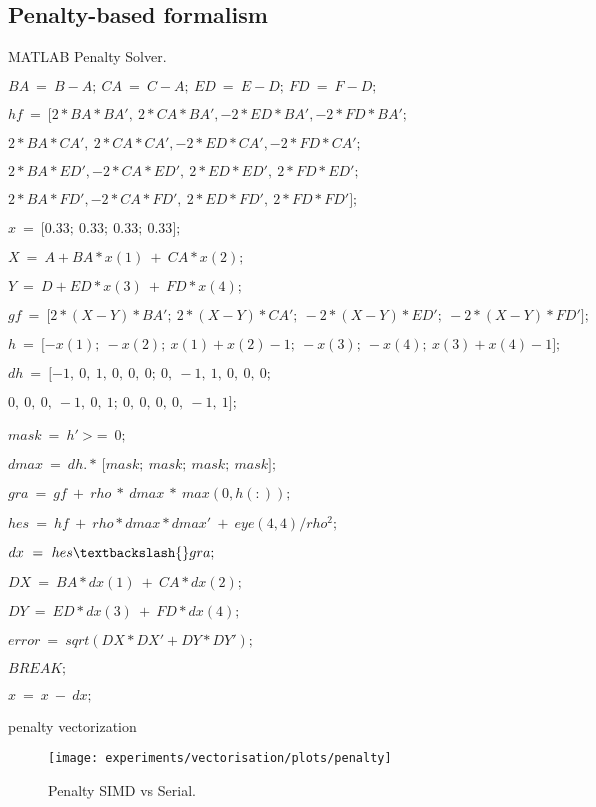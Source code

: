 \subsection{Penalty-based formalism}

\begin{algorithm}
	\protect\caption{\label{alg4}MATLAB Penalty Solver.}
	\begin{algorithmic}[1]

		\State $BA~=~B-A;~CA~=~C-A;~ED~=~E-D;~FD~=~F-D;$

		\State $hf~=~{[}2{*}BA{*}BA',~2{*}CA{*}BA',-2{*}ED{*}BA',-2{*}FD{*}BA';$

		\State $2{*}BA{*}CA',~2{*}CA{*}CA',-2{*}ED{*}CA',-2{*}FD{*}CA';$

		\State $2{*}BA{*}ED',-2{*}CA{*}ED',~2{*}ED{*}ED',~2{*}FD{*}ED';$

		\State $2{*}BA{*}FD',-2{*}CA{*}FD',~2{*}ED{*}FD',~2{*}FD{*}FD'{]};$

		\State $x~=~{[}0.33;~0.33;~0.33;~0.33{]};$


			\State $X~=~A+BA{*}x(1)~+~CA{*}x(2);$

			\State $Y~=~D+ED{*}x(3)~+~FD{*}x(4);$

			\State $gf~=~{[}2{*}(X-Y){*}BA';~2{*}(X-Y){*}CA';~-2{*}(X-Y){*}ED';~-2{*}(X-Y){*}FD'{]};$

			\State $h~=~{[}-x(1);~-x(2);~x(1)+x(2)-1;~-x(3);~-x(4);~x(3)+x(4)-1{]};$

			\State $dh~=~{[}-1,~0,~1,~0,~0,~0;~0,~-1,~1,~0,~0,~0;$

			\State $0,~0,~0,~-1,~0,~1;~0,~0,~0,~0,~-1,~1{]};$

			\State $mask~=~h'~$>$=~0;$

			\State $dmax~=~dh.{*}~{[}mask;~mask;~mask;~mask{]};$

			\State $gra~=~gf~+~rho~{*}~dmax~{*}~max(0,h(:));$

			\State $hes~=~hf~+~rho{*}dmax{*}dmax'~+~eye(4,4)/rho^2;$

			\State $dx~=~hes\textbackslash{}gra;$

			\State $DX~=~BA{*}dx(1)~+~CA{*}dx(2);$

			\State $DY~=~ED{*}dx(3)~+~FD{*}dx(4);$

			\State $error~=~sqrt(DX{*}DX'+DY{*}DY');$

				\State $BREAK;$
			\EndIf

			\State $x~=~x~-~dx;$

		\EndFor

	\EndFunction
	\end{algorithmic}

\end{algorithm}

penalty vectorization

\begin{figure}[!h]
\centering
\texttt{[image: experiments/vectorisation/plots/penalty]} \protect\caption{\label{fig17}Penalty 	SIMD vs Serial.}
\end{figure} 